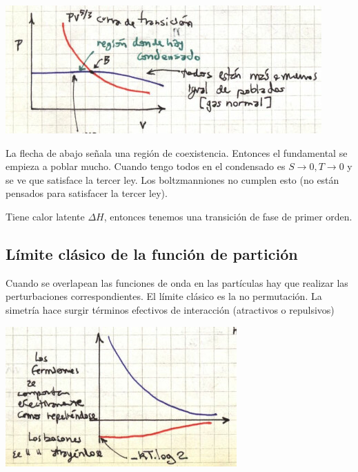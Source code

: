 \documentclass[10pt,oneside]{CBFT_book}
\begin{document}
\includegraphics[scale=0.5]{images/1606329555.jpg}

La flecha de abajo señala una región de coexistencia. Entonces el fundamental se empieza a poblar mucho.
Cuando tengo todos en el condensado es $ S \to 0, T \to 0$ y se ve que satisface la tercer ley.
Los boltzmanniones no cumplen esto (no están pensados para satisfacer la tercer ley).

Tiene calor latente $ \Delta H $, entonces tenemos una transición de fase de primer orden.

\subsection{Límite clásico de la función de partición}

Cuando se overlapean las funciones de onda en las partículas hay que realizar las perturbaciones 
correspondientes.
El límite clásico es la no permutación. La simetría hace surgir términos efectivos de interacción
(atractivos o repulsivos)

\includegraphics[scale=0.5]{images/1606329560.jpg}
\end{document}
